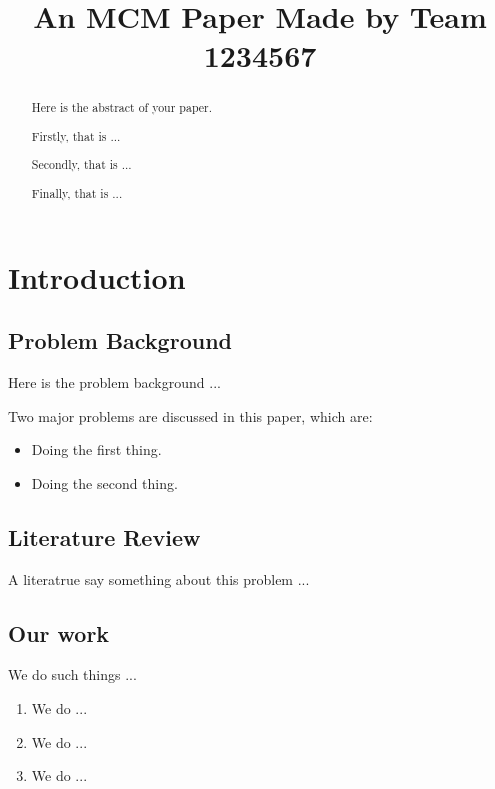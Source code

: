 \documentclass[12pt]{article}  %
\title{An MCM Paper Made by Team 1234567}  %
\begin{document}
	
	\begin{abstract}
		Here is the abstract of your paper.
		
		Firstly, that is ...
		
		Secondly, that is ...
		
		Finally, that is ...
		
		
	\end{abstract}
	
	\maketitle  %
	\tableofcontents  %
	
	
	\section{Introduction}
	\subsection{Problem Background}
	Here is the problem background ...
	
	Two major problems are discussed in this paper, which are:
	\begin{itemize}
		\item Doing the first thing.
		\item Doing the second thing.
	\end{itemize}
	
	\subsection{Literature Review}
	A literatrue\cite{1} say something about this problem ...
	
	\subsection{Our work}
	We do such things ...
	
	\begin{enumerate}[\bfseries 1.]
		\item We do ...
		\item We do ...
		\item We do ...
	\end{enumerate}
	
\end{document}
